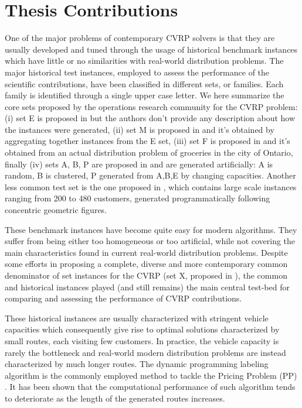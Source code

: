 \section{Thesis Contributions}
\label{sec:intro-thesis-contributions}

One of the major problems of contemporary CVRP solvers
is that they are usually developed and tuned through the usage
of historical benchmark instances which
have little or no similarities with real-world distribution problems.
The major historical test instances,
employed to assess the performance of the scientific contributions,
have been classified in different sets, or families.
Each family is identified through a single upper case letter.
We here summarize the core sets proposed by the operations research community for the CVRP problem:
(i) set E is proposed in \textcite{christofides1969} but the authors don't provide any
description about how the instances were generated,
(ii) set M is proposed in \textcite{christofides1979} and
it's obtained by aggregating together instances from the E set,
(iii) set F is proposed in \textcite{fisher1994} and it's obtained from an actual distribution problem of groceries in the city of Ontario,
finally (iv) sets A, B, P are proposed in \textcite{augerat1995} and are generated artificially: A is random, B is clustered, P generated from A,B,E by changing capacities.
Another less common test set is the one proposed in \textcite{golden1998},
which contains large scale instances ranging from 200 to 480 customers,
generated programmatically following concentric geometric figures.

These benchmark instances have become quite easy for modern algorithms.
They suffer from being either too homogeneous or too artificial,
while not covering the main characteristics found in current real-world distribution problems.
Despite some efforts in proposing a complete, diverse and more contemporary common denominator
of set instances for the CVRP (set X, proposed in \textcite{uchoa2017}),
the common and historical instances played (and still remains) the main central test-bed for comparing
and assessing the performance of CVRP contributions.

These historical instances are usually characterized with stringent vehicle capacities
which consequently give rise to optimal solutions characterized by small routes, each visiting few customers.
In practice, the vehicle capacity is rarely the bottleneck and
real-world modern distribution problems are instead characterized by much longer routes.
The dynamic programming labeling algorithm
\parencite{desrochers1992,feillet2004}
is the commonly employed method to tackle the Pricing Problem (PP) \parencite{gutierrez-jarpa2010, archetti2011, bettinelli2011, contardo2014, contardo2015, pecin2017b, pecin2017, pessoa2020a}.
It has been shown that the computational performance of such algorithm
tends to deteriorate as the length of the generated routes increases.

